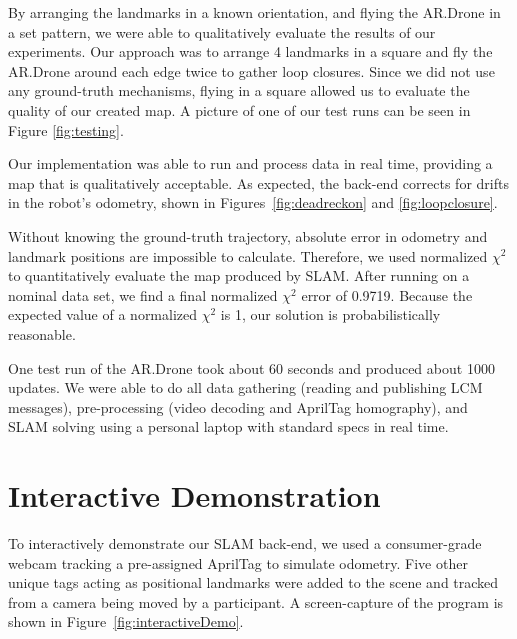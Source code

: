 \documentclass[conference]{IEEEtran}
\begin{document}
By arranging the landmarks in a known orientation, and flying the AR.Drone in a set
pattern, we were able to qualitatively evaluate the results of our experiments. Our
approach was to arrange 4 landmarks in a square and fly the AR.Drone around each edge
twice to gather loop closures. Since we did not use any ground-truth mechanisms, flying in
a square allowed us to evaluate the quality of our created map. A picture of one of our
test runs can be seen in Figure \ref{fig:testing}.

Our implementation was able to run and process data in real time, providing a map that is
qualitatively acceptable.  As expected, the back-end corrects for drifts in the robot's
odometry, shown in Figures~\ref{fig:deadreckon} and \ref{fig:loopclosure}.


Without knowing the ground-truth trajectory, absolute error in odometry and landmark
positions are impossible to calculate.  Therefore, we used normalized $\chi^2$ to
quantitatively evaluate the map produced by \ac{SLAM}.  After running on a nominal data
set, we find a final normalized $\chi^2$ error of 0.9719.  Because the expected
value of a normalized $\chi^2$ is 1, our solution is probabilistically reasonable.

One test run of the AR.Drone took about 60 seconds and produced about 1000 updates. We
were able to do all data gathering (reading and publishing LCM messages), pre-processing
(video decoding and AprilTag homography), and \ac{SLAM} solving using a personal laptop
with standard specs in real time.

\section{Interactive Demonstration}

To interactively demonstrate our \ac{SLAM} back-end, we used a consumer-grade webcam
tracking a pre-assigned AprilTag to simulate odometry. Five other unique tags acting as
positional landmarks were added to the scene and tracked from a camera being moved by a
participant. A screen-capture of the program is shown in Figure~\ref{fig:interactiveDemo}.
\end{document}
